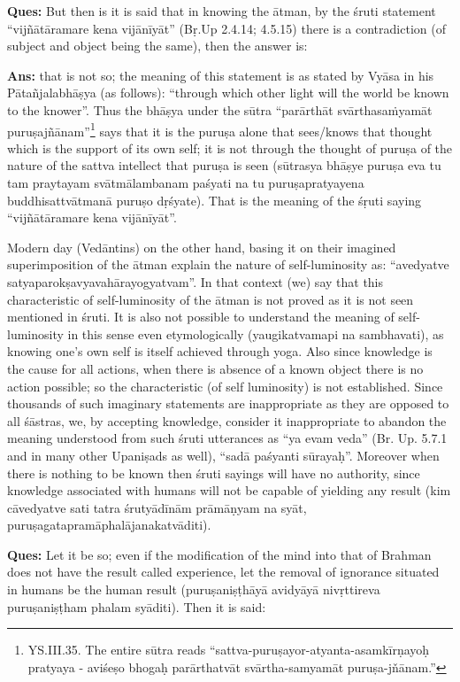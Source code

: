 \textbf{Ques:} But then is it is said that in knowing the ātman, by the śruti statement “vijñātāramare kena vijānīyāt” (Bṛ.Up 2.4.14; 4.5.15) there is a contradiction (of subject and object being the same), then the answer is:

\textbf{Ans:} that is not so; the meaning of this statement is as stated by Vyāsa in his Pātañjalabhāṣya (as follows): “through which other light will the world be known to the knower”. Thus the bhāṣya under the sūtra “parārthāt svārthasaṁyamāt puruṣajñānam”\footnote{YS.III.35. The entire sūtra reads “sattva-puruṣayor-atyanta-asamkīrṇayoḥ pratyaya - aviśeṣo bhogaḥ parārthatvāt svārtha-samyamāt puruṣa-jňānam.”} says that it is the puruṣa alone that sees/knows that thought which is the support of its own self; it is not through the thought of puruṣa    of the nature of the sattva intellect that puruṣa is seen (sūtrasya bhāṣye puruṣa eva tu tam praytayam svātmālambanam paśyati na tu puruṣapratyayena buddhisattvātmanā puruṣo dṛśyate). That is the meaning of the śṛuti saying “vijñātāramare kena vijānīyāt”.

Modern day (Vedāntins) on the other hand, basing it on their imagined superimposition of the ātman explain the nature of self-luminosity as: “avedyatve satyaparokṣavyavahārayogyatvam”. In that context (we) say that this characteristic of self-luminosity of the ātman is not proved as it is not seen mentioned in śruti. It is also not possible to understand the meaning of self-luminosity in this sense even etymologically (yaugikatvamapi na sambhavati), as knowing one’s own self is itself achieved through yoga. Also since knowledge is the cause for all actions, when there is absence of a known object there is no action possible; so the characteristic (of self luminosity) is not established.   Since thousands of such imaginary statements are inappropriate as they are opposed to all śāstras, we, by accepting knowledge, consider it inappropriate to abandon the meaning understood from such śruti utterances as “ya evam veda” (Br. Up. 5.7.1 and in many other Upaniṣads as well), “sadā paśyanti sūrayaḥ”. Moreover when there is nothing to be known then śruti sayings will have no authority, since knowledge associated with humans will not be capable of yielding any result (kim cāvedyatve sati tatra śrutyādīnām prāmāṇyam na syāt, puruṣagatapramāphalājanakatvāditi).

\textbf{Ques:} Let it be so; even if the modification of the mind into that of Brahman does not have the result called experience, let the removal of ignorance situated in humans be the human result (puruṣaniṣṭhāyā avidyāyā nivṛttireva puruṣaniṣṭham phalam syāditi). Then it is said: 

